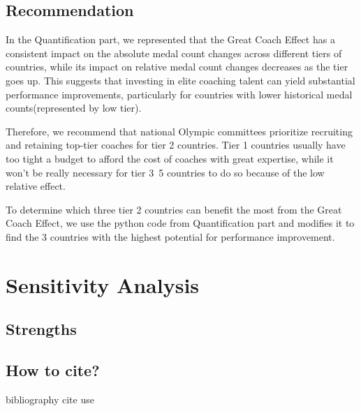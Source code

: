 \documentclass{mcmthesis}
\begin{document}
\subsection{Recommendation}

In the Quantification part, we represented that the Great Coach Effect has a consistent impact on the absolute medal count changes across different tiers of countries, while its impact on relative medal count changes decreases as the tier goes up. This suggests that investing in elite coaching talent can yield substantial performance improvements, particularly for countries with lower historical medal counts(represented by low tier).

Therefore, we recommend that national Olympic committees prioritize recruiting and retaining top-tier coaches for tier 2 countries. Tier 1 countries usually have too tight a budget to afford the cost of coaches with great expertise, while it won't be really necessary for tier 3~5 countries to do so because of the low relative effect.

To determine which three tier 2 countries can benefit the most from the Great Coach Effect, we use the python code from Quantification part and modifies it to find the 3 countries with the highest potential for performance improvement. 

\section{Sensitivity Analysis}

\subsection{Strengths}

\subsection{How to cite?}
bibliography cite use \cite{1}

\end{document}
